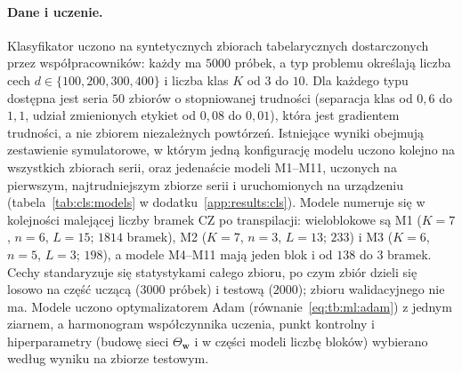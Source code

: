 \paragraph{Dane i uczenie.}
Klasyfikator uczono na syntetycznych zbiorach tabelarycznych dostarczonych przez współpracowników: każdy ma $5000$ próbek, a typ problemu określają liczba cech $d\in\{100,200,300,400\}$ i liczba klas $K$ od $3$ do $10$.
Dla każdego typu dostępna jest seria $50$ zbiorów o stopniowanej trudności (separacja klas od $0{,}6$ do $1{,}1$, udział zmienionych etykiet od $0{,}08$ do $0{,}01$), która jest gradientem trudności, a nie zbiorem niezależnych powtórzeń.
Istniejące wyniki obejmują zestawienie symulatorowe, w którym jedną konfigurację modelu uczono kolejno na wszystkich zbiorach serii, oraz jedenaście modeli M1--M11, uczonych na pierwszym, najtrudniejszym zbiorze serii i uruchomionych na urządzeniu (tabela~\ref{tab:cls:models} w dodatku~\ref{app:results:cls}).
Modele numeruje się w kolejności malejącej liczby bramek CZ po transpilacji: wieloblokowe są M1 ($K=7$, $n=6$, $L=15$; $1814$ bramek), M2 ($K=7$, $n=3$, $L=13$; $233$) i M3 ($K=6$, $n=5$, $L=3$; $198$), a modele M4--M11 mają jeden blok i od $138$ do $3$ bramek.
Cechy standaryzuje się statystykami całego zbioru, po czym zbiór dzieli się losowo na część uczącą ($3000$ próbek) i testową ($2000$); zbioru walidacyjnego nie ma.
Modele uczono optymalizatorem Adam (równanie~\eqref{eq:tb:ml:adam}) z jednym ziarnem, a harmonogram współczynnika uczenia, punkt kontrolny i hiperparametry (budowę sieci $\Theta_{\mathbf{w}}$ i w części modeli liczbę bloków) wybierano według wyniku na zbiorze testowym.
